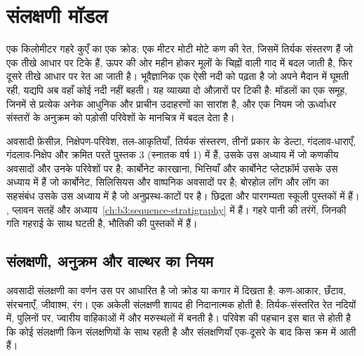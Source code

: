 \chapter{संलक्षणी मॉडल}\label{ch:b3:facies-models}

एक किलोमीटर गहरे कुएँ का एक क्रोड: एक मीटर मोटी मोटे कण की रेत, जिसमें
तिर्यक संस्तरण हैं जो एक तीखे आधार पर टिके हैं, ऊपर की ओर महीन होकर मूलों के चिह्नों वाली गाद में
बदल जाती है, फिर दूसरे तीखे आधार पर रेत आ जाती है। भूवैज्ञानिक एक ऐसी नदी को पढ़ता है
जो अपने मैदान में घूमती रही, यद्यपि अब वहाँ कोई नदी नहीं बहती। यह व्याख्या
दो औज़ारों पर टिकी है: मॉडलों का एक समूह, जिनमें से प्रत्येक अनेक आधुनिक और
प्राचीन उदाहरणों का सारांश है, और एक नियम जो ऊर्ध्वाधर संस्तरों के अनुक्रम को
पड़ोसी परिवेशों के मानचित्र में बदल देता है।

\begin{recall}
अवसादी फ़ेसीज़, निक्षेपण-परिवेश, तल-आकृतियाँ, तिर्यक संस्तरण,
तीनों प्रकार के डेल्टा, गंदलाव-धाराएँ, गंदलाव-निक्षेप और क्रमित परतें
पुस्तक 3 (स्नातक वर्ष 1) में हैं, उसके उस अध्याय में जो कणकीय अवसादों और उनके
परिवेशों पर है; कार्बोनेट कारखाना, भित्तियाँ और कार्बोनेट प्लेटफ़ॉर्म उसके उस अध्याय में
हैं जो कार्बोनेट, सिलिसियस और वाष्पनिक अवसादों पर है; बोरहोल लॉग और
लॉग का सहसंबंध उसके उस अध्याय में है जो अनुप्रस्थ-काटों पर है। छिद्रता और
पारगम्यता स्कूली पुस्तकों में हैं। , प्लावन सतहें और
 अध्याय~\ref{ch:b3:sequence-stratigraphy} में हैं। गहरे पानी की तरंगें,
जिनकी गति गहराई के साथ घटती है, भौतिकी की पुस्तकों में हैं।
\end{recall}

\section{संलक्षणी, अनुक्रम और वाल्थर का नियम}\label{sec:b3:facies-models:walther}

अवसादी संलक्षणी का वर्णन उस पर आधारित है जो क्रोड या
कगार में दिखता है: कण-आकार, छँटाव, संरचनाएँ, जीवाश्म, रंग। एक अकेली संलक्षणी
शायद ही निदानात्मक होती है: तिर्यक-संस्तरित रेत नदियों में, पुलिनों पर, ज्वारीय
वाहिकाओं में और मरुस्थलों में बनती है। परिवेश की पहचान इस बात से होती है कि
कोई संलक्षणी किन संलक्षणियों के साथ रहती है और संलक्षणियाँ एक-दूसरे के बाद किस क्रम में आती हैं।

